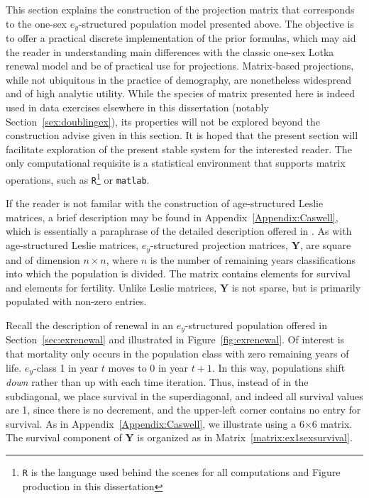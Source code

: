  \FloatBarrier
\label{sec:ex1sexleslie}
This section explains the construction of the projection matrix that corresponds
to the one-sex $e_y$-structured population model presented above. The objective is
to offer a practical discrete implementation of the prior
formulas, which may aid the reader in understanding main differences with the
classic one-sex Lotka renewal model and be of practical use for projections.
Matrix-based projections, while not ubiquitous in the practice of demography,
are nonetheless widespread and of high analytic utility. While the species of
matrix presented here is indeed used in data exercises elsewhere in this
dissertation (notably Section~\ref{sex:doublingex}), its properties will not be
explored beyond the construction advise given in this section. It is hoped that
the present section will facilitate exploration of the present stable system for
the interested reader. The only computational requisite is a statistical
environment that supports matrix operations, such as
\texttt{R}\citep{Rcitation}\footnote{\texttt{R} is the language used behind the
scenes for all computations and Figure production in this dissertation} or
\texttt{matlab}\citep{MATLAB:2010}.

If the reader is not familar with the construction
of age-structured Leslie matrices, a brief description may be found in
Appendix~\ref{Appendix:Caswell}, which is essentially a paraphrase of the
detailed description offered in \cite{caswell2001matrix}. As with
age-structured Leslie matrices, $e_y$-structured projection matrices,
$\textbf{Y}$, are square and of dimension $n \times n$, where $n$ is the number
of remaining years classifications into which the population is divided. The matrix contains
elements for survival and elements for fertility. Unlike Leslie matrices,
$\textbf{Y}$ is not sparse, but is primarily populated with non-zero entries.

Recall the description of renewal in an $e_y$-structured population offered in
Section~\ref{sec:exrenewal} and illustrated in Figure~\ref{fig:exrenewal}. Of
interest is that mortality only occurs in the population class with zero
remaining years of life. $e_y$-class 1 in year $t$ moves to 0 in year $t+1$.
In this way, populations shift \textit{down} rather than up with each time iteration.
Thus, instead of in the subdiagonal, we place survival in the superdiagonal, and
indeed all survival values are 1, since there is no decrement, and the
upper-left corner contains no entry for survival. As in
Appendix~\ref{Appendix:Caswell}, we illustrate using a 6$\times$6 matrix. The
survival component of $\textbf{Y}$ is organized as in
Matrix~\ref{matrix:ex1sexsurvival}.

